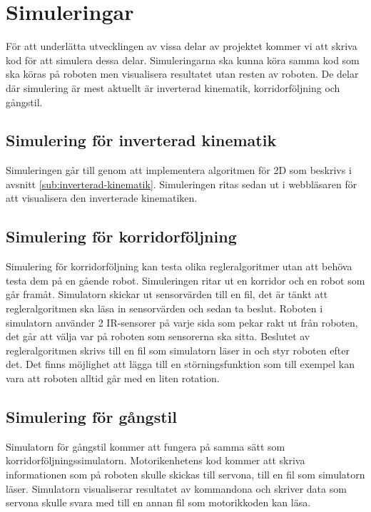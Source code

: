 \documentclass[a4paper,titlepage,12pt]{article}
\begin{document}
	\section{Simuleringar}
	För att underlätta utvecklingen av vissa delar av projektet kommer vi att skriva
	kod för att simulera dessa delar. Simuleringarna ska kunna köra samma kod som ska
	köras på roboten men visualisera resultatet utan resten av roboten. De delar där 
	simulering är mest aktuellt är inverterad kinematik, korridorföljning och 
	gångstil.

	\subsection{Simulering för inverterad kinematik}
	Simuleringen går till genom att implementera algoritmen för 2D som beskrivs i avsnitt \ref{sub:inverterad-kinematik}. Simuleringen ritas sedan ut i webbläsaren för att visualisera den inverterade kinematiken.
	
	\subsection{Simulering för korridorföljning}
	Simulering för korridorföljning kan testa olika regleralgoritmer utan att behöva testa 
	dem på en gående robot. Simuleringen ritar ut en korridor och en robot som går framåt. 
	Simulatorn skickar ut sensorvärden till en fil, det är tänkt att regleralgoritmen ska 
	läsa in sensorvärden och sedan ta beslut. Roboten i simulatorn använder 2 IR-sensorer på varje 
	sida som pekar rakt ut från roboten, det går att välja var på roboten som sensorerna ska 
	sitta. Beslutet av regleralgoritmen skrivs till en fil som simulatorn läser in och 
	styr roboten efter det. Det finns möjlighet att lägga till en störningsfunktion som till 
	exempel kan vara att roboten alltid går med en liten rotation. 
	
	\subsection{Simulering för gångstil}
	Simulatorn för gångstil kommer att fungera på samma sätt som 
	korridorföljningssimulatorn. Motorikenhetens kod kommer att skriva informationen som
	på roboten skulle skickas till servona, till en fil som simulatorn läser. Simulatorn
	visualiserar resultatet av kommandona och skriver data som servona skulle svara
	med till en annan fil som motorikkoden kan läsa.
\end{document}
